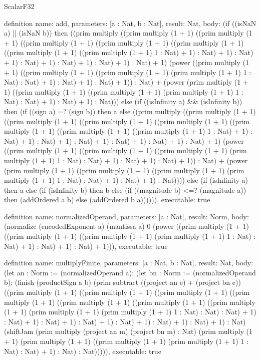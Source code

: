 \begin{lexlean}{ScalarF32}
\begin{semanticmodule}
definition{
  name: add,
  parameters: [a : Nat, b : Nat],
  result: Nat,
  body: (if ((isNaN a) || (isNaN b)) then ((prim multiply ((prim multiply (1 + 1) ((prim multiply (1 + 1) ((prim multiply (1 + 1) ((prim multiply (1 + 1) ((prim multiply (1 + 1) ((prim multiply (1 + 1) ((prim multiply (1 + 1) 1 : Nat) + 1) : Nat) + 1) : Nat) + 1) : Nat) + 1) : Nat) + 1) : Nat) + 1) : Nat) + 1) (power ((prim multiply (1 + 1) ((prim multiply (1 + 1) ((prim multiply (1 + 1) (prim multiply (1 + 1) 1 : Nat) : Nat) + 1) : Nat) + 1) : Nat) + 1)) : Nat) + (power (prim multiply (1 + 1) ((prim multiply (1 + 1) ((prim multiply (1 + 1) (prim multiply (1 + 1) 1 : Nat) : Nat) + 1) : Nat) + 1) : Nat))) else (if ((isInfinity a) && (isInfinity b)) then (if ((sign a) =? (sign b)) then a else ((prim multiply ((prim multiply (1 + 1) ((prim multiply (1 + 1) ((prim multiply (1 + 1) ((prim multiply (1 + 1) ((prim multiply (1 + 1) ((prim multiply (1 + 1) ((prim multiply (1 + 1) 1 : Nat) + 1) : Nat) + 1) : Nat) + 1) : Nat) + 1) : Nat) + 1) : Nat) + 1) : Nat) + 1) (power ((prim multiply (1 + 1) ((prim multiply (1 + 1) ((prim multiply (1 + 1) (prim multiply (1 + 1) 1 : Nat) : Nat) + 1) : Nat) + 1) : Nat) + 1)) : Nat) + (power (prim multiply (1 + 1) ((prim multiply (1 + 1) ((prim multiply (1 + 1) (prim multiply (1 + 1) 1 : Nat) : Nat) + 1) : Nat) + 1) : Nat)))) else (if (isInfinity a) then a else (if (isInfinity b) then b else (if ((magnitude b) <=? (magnitude a)) then (addOrdered a b) else (addOrdered b a)))))),
  executable: true
}

definition{
  name: normalizedOperand,
  parameters: [a : Nat],
  result: Norm,
  body: (normalize (encodedExponent a) (mantissa a) 0 (power ((prim multiply (1 + 1) ((prim multiply (1 + 1) ((prim multiply (1 + 1) (prim multiply (1 + 1) 1 : Nat) : Nat) + 1) : Nat) + 1) : Nat) + 1))),
  executable: true
}

definition{
  name: multiplyFinite,
  parameters: [a : Nat, b : Nat],
  result: Nat,
  body: (let an : Norm := (normalizedOperand a); (let bn : Norm := (normalizedOperand b); (finish (productSign a b) (prim subtract ((project an e) + (project bn e)) ((prim multiply (1 + 1) ((prim multiply (1 + 1) ((prim multiply (1 + 1) ((prim multiply (1 + 1) ((prim multiply (1 + 1) ((prim multiply (1 + 1) ((prim multiply (1 + 1) (prim multiply (1 + 1) (prim multiply (1 + 1) 1 : Nat) : Nat) : Nat) + 1) : Nat) + 1) : Nat) + 1) : Nat) + 1) : Nat) + 1) : Nat) + 1) : Nat) + 1) : Nat) (shiftJam (prim multiply (project an m) (project bn m) : Nat) (prim multiply (1 + 1) (prim multiply (1 + 1) ((prim multiply (1 + 1) (prim multiply (1 + 1) 1 : Nat) : Nat) + 1) : Nat) : Nat))))),
  executable: true
}


\end{semanticmodule}
\end{lexlean}

